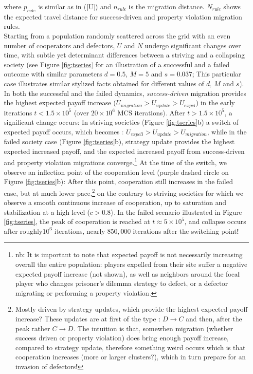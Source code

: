 where $p_{rule}$ is similar as in (\ref{U}) and $n_{rule}$ is the migration distance. $N_{rule}$ shows the expected travel distance for success-driven and property violation migration rules.\\

Starting from a population randomly scattered across the grid with an even number of cooperators and defectors, $U$ and $N$ undergo significant changes over time, with subtle yet determinant differences between a striving and a collapsing society (see Figure \ref{fig:tseries} for an illustration of a successful and a failed outcome with similar parameters $d=0.5$, $M=5$ and $s=0.037$; This particular case illustrates similar stylized facts obtained for different values of $d$, $M$ and $s$). In both the successful and the failed dynamics, {\it success-driven} migration provides the highest expected payoff increase ($U_{migration} > U_{update} > U_{expel}$)  in the early iterations $t < 1.5\times10^{5}$ (over $20\times10^6$ MCS iterations). After $t > 1.5\times10^{5}$, a significant change occurs: In striving societies (Figure \ref{fig:tseries}b) a switch of expected payoff occurs, which becomes : $U_{expell} > U_{update} > U_{migration}$, while in the failed society case (Figure \ref{fig:tseries}b), strategy update provides the highest expected increased payoff, and the expected increased payoff from success-driven and property violation migrations converge.\footnote{ nb: It is important to note that expected payoff is not necessarily increasing overall the entire population: players expelled from their site suffer a negative expected payoff increase (not shown), as well as neighbors around the focal player who changes prisoner's dilemma strategy to defect, or a defector migrating or performing a property violation.} At the time of the switch, we observe an inflection point of the cooperation level (purple dashed circle on Figure \ref{fig:tseries}b): After this point, cooperation still increases in the failed case, but at much lower pace,\footnote{Mostly driven by strategy updates, which provide the highest expected payoff increase? These updates are at first of the type : $D \rightarrow C$ and then, after the peak rather $C \rightarrow D$. The intuition is that, somewhen migration (whether success driven or property violation) does bring enough payoff increase, compared to strategy update, therefore something weird occurs which is that cooperation increases (more or larger clusters?), which in turn prepare for an invasion of defectors!} on the contrary to striving societies for which we observe a smooth continuous increase of cooperation, up to saturation and stabilization at a high level ($c > 0.8$). In the failed scenario illustrated in Figure \ref{fig:tseries}, the peak of cooperation is reached at  $t \approx 5\times10^5$, and collapse occurs after roughly$10^6$ iterations, nearly $850,000$ iterations after the switching point!\\


